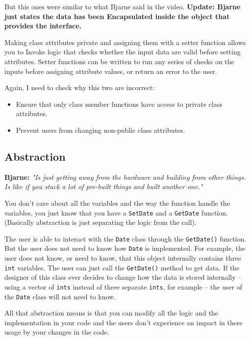 \documentclass[11pt, a4paper]{article}
\begin{document}
But this ones were similar to what Bjarne said in the video. \textbf{Update: Bjarne just states the data has been Encapsulated inside the object that provides the interface. }


Making class attributes private and assigning them with a setter function allows you to Invoke logic that checks whether the input data are valid before setting attributes.
Setter functions can be written to run any series of checks on the inputs before assigning attribute values, or return an error to the user. 

Again, I need to check why this two are incorrect:
\begin{itemize}
	\item Ensure that only class member functions have access to private class attributes.
	\item Prevent users from changing non-public class attributes.
\end{itemize}



\subsection{Abstraction}%
\label{sub:abstraction}

\textbf{Bjarne:} \textit{"Is just getting away from the hardware and building from other things. Is like if you stack a lot of pre-built things and built another one."}

You don't care about all the variables and the way the function handle the variables, you just know that you have a \texttt{SetDate} and a \texttt{GetDate} function. (Basically abstraction is just separating the logic from the call).


The user is able to interact with the \texttt{Date} class through the \texttt{GetDate()} function. But the user does not need to know how \texttt{Date} is implemented. For example, the user does not know, or need to know, that this object internally contains three \texttt{int} variables. The user can just call the \texttt{GetDate()} method to get data. If the designer of this class ever decides to change how the data is stored internally -- using a vector of \texttt{ints} instead of three separate \texttt{ints}, for example -- the user of the \texttt{Date} class will not need to know.




All that abstraction means is that you can modify all the logic and the implementation in your code and the users don't experience an impact in there usage by your changes in the code. 
\end{document}
